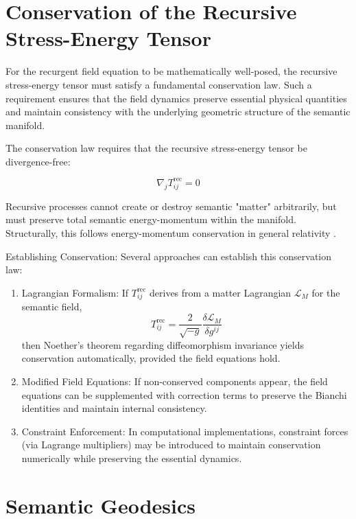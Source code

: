 \section{Conservation of the Recursive Stress-Energy Tensor}

For the recurgent field equation to be mathematically well-posed, the recursive stress-energy tensor must satisfy a fundamental conservation law. Such a requirement ensures that the field dynamics preserve essential physical quantities and maintain consistency with the underlying geometric structure of the semantic manifold.

The conservation law requires that the recursive stress-energy tensor be divergence-free:

\begin{equation}
\nabla_j T^{\mathrm{rec}}_{ij} = 0
\end{equation}

Recursive processes cannot create or destroy semantic "matter" arbitrarily, but must preserve total semantic energy-momentum within the manifold. Structurally, this follows energy-momentum conservation in general relativity \autocite{MisnerThorneWheeler1973, Wald1984}.

Establishing Conservation: Several approaches can establish this conservation law:

\begin{enumerate}
    \item Lagrangian Formalism: If \(T^{\mathrm{rec}}_{ij}\) derives from a matter Lagrangian \(\mathcal{L}_M\) for the semantic field,
    \begin{equation}
    T^{\mathrm{rec}}_{ij} = \frac{2}{\sqrt{-g}} \frac{\delta \mathcal{L}_M}{\delta g^{ij}}
    \end{equation}
    then Noether's theorem \autocite{Noether1918} regarding diffeomorphism invariance yields conservation automatically, provided the field equations hold.
    \item Modified Field Equations: If non-conserved components appear, the field equations can be supplemented with correction terms to preserve the Bianchi identities \autocite{Bianchi1902} and maintain internal consistency.
    \item Constraint Enforcement: In computational implementations, constraint forces (via Lagrange multipliers) may be introduced to maintain conservation numerically while preserving the essential dynamics.
\end{enumerate}

\section{Semantic Geodesics}

